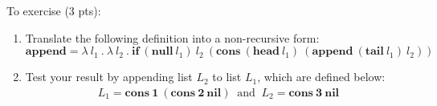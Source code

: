 \documentclass [11pt, a4wide, twoside]{article}
\begin{document}
\begin{enumerate}
\noindent To exercise (3 pts):
%
\begin{enumerate}
\item Translate the following definition into a non-recursive form:
	\begin{equation*}
	\textbf{append} = \lambda~ l_{1} ~.~ \lambda~ l_{2} ~.~\textbf{if}~ (\textbf{null}~ l_{1}) ~l_{2} ~(\textbf{cons} ~(\textbf{head} ~l_{1}) ~ (\textbf{append}~ (\textbf{tail} ~ l_{1}) ~ l_{2}))
	\end{equation*}
\item Test your result by appending list $L_2$ to list $L_1$, which are defined below:
	\begin{align*}
	L_{1}  = \textbf{cons}~\textbf{1} ~(\textbf{cons} ~\textbf{2} ~\textbf{nil})~ \text{ and } ~ L_{2} = \textbf{cons}~ \textbf{3} ~\textbf{nil}\\
	\end{align*}
\end{enumerate}
%


\end{enumerate}
\end{document}
